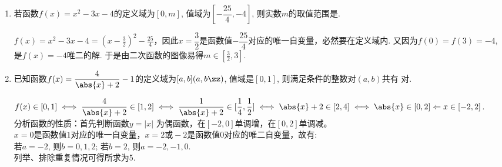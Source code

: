 \begin{enumerate}
\begin{enumerate}
    \item 求$y=f(x)$的解析式; 
    \item 若$g(x)=f(\frac{1}{x})$, 求$y=g(x)$的解析式, 并作出$g(x)$的图像. 
    \end{enumerate}
    \begin{jieda}
    \begin{enumerate}
    \item $f(x)=\begin{cases}
    \frac{1}{2}x+1, & x\in[-2,0)\\
    0, & x = 0 \\
    \frac{1}{2}x-1, & x\in(0,2]
    \end{cases}$. 
    
    \item $g(x)=\begin{cases}
    \frac{1}{2x}+1, & x\leq-\frac{1}{2}\\
    \frac{1}{2x}-1, & x\geq\frac{1}{2}
    \end{cases}$. \\
    \end{enumerate}
    \ps 正确率太低, 问题集中在$g(x)$的定义域上.
    \end{jieda}
    \item 若函数$f(x)=x^2-3x-4$的定义域为$[0,m]$, 值域为$\left[-\dfrac{25}{4},-4\right]$, 则实数$m$的取值范围是\blkda{$[\frac{3}{2},3]$}. 
    \begin{jieda}
    $f(x)=x^2-3x-4=(x-\frac{3}{2})^2-\frac{25}{4}$，因此$x = \dfrac{3}{2}$是函数值$-\dfrac{25}{4}$对应的唯一自变量，必然要在定义域内. 又因为$f(0)=f(3)=-4$, 是$f(x)=-4$唯二的解. 于是由二次函数的图像易得$m\in[\frac{3}{2},3]$. 
    \end{jieda}
    \item 已知函数$f(x)=\dfrac{4}{\abs{x}+2}-1$的定义域为$[a,b](a,b\zz)$, 值域是$[0,1]$, 则满足条件的整数对$(a,b)$共有 对. 
    \begin{jieda}
    $f(x)\in[0,1] \iff \dfrac{4}{\abs{x}+2} \in [1, 2] \iff \dfrac{1}{\abs{x}+2} \in [\dfrac{1}{4}, \dfrac{1}{2}] \iff \abs{x}+2 \in [2, 4] \iff \abs{x}\in[0,2] \Leftarrow  x\in[-2,2]$. \\
    分析函数的性质：首先判断函数$y = |x|$ 为偶函数，在$[-2, 0]$单调增，在$[0, 2]$单调减。\\
    $x = 0$是函数值$1$对应的唯一自变量，$x = 2 \mbox{或} -2$是函数值$0$对应的唯二自变量，故有: \\
    若$a=-2$, 则$b=0,1,2$; 若$b=2$, 则$a=-2,-1,0$. \\
    列举、排除重复情况可得所求为5. 

\end{jieda}
\end{enumerate}
